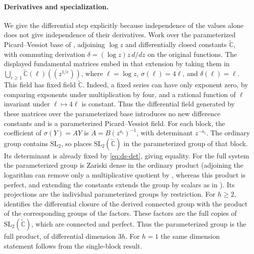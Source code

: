 \documentclass[11pt,a4paper]{article}
\theoremstyle{definition}
\theoremstyle{remark}
\numberwithin{equation}{section}
\begin{document}
\paragraph{Derivatives and specialization.}
We give the differential step explicitly because independence of the values alone does not give independence of their derivatives. Work over the parameterized Picard--Vessiot base of \cite{dsdhr}, adjoining \(\log z\) and differentially closed constants \(\widetilde{\mathbb C}\), with commuting derivation \(\delta=(\log z)z\,d/dz\) on the original functions. The displayed fundamental matrices embed in that extension by taking them in \(\bigcup_{e\geq1}\widetilde{\mathbb C}(\ell)((z^{1/e}))\), where \(\ell=\log z\), \(\sigma(\ell)=4\ell\), and \(\delta(\ell)=\ell\). This field has fixed field \(\widetilde{\mathbb C}\). Indeed, a fixed series can have only exponent zero, by comparing exponents under multiplication by four, and a rational function of \(\ell\) invariant under \(\ell\mapsto4\ell\) is constant. Thus the differential field generated by these matrices over the parameterized base introduces no new difference constants and is a parameterized Picard--Vessiot field. For each block, the coefficient of \(\sigma(Y)=A Y\) is \(A=B(z^{a_i})^{-1}\), with determinant \(z^{-a_i}\). The ordinary group contains \(\mathrm{SL}_2\), so \cite[Theorem 4.1]{dsdhr} places \(\mathrm{SL}_2(\widetilde{\mathbb C})\) in the parameterized group of that block. Its determinant is already fixed by \eqref{eq:ds-det}, giving equality. For the full system the parameterized group is Zariski dense in the ordinary product (adjoining the logarithm can remove only a multiplicative quotient by \cite[Proposition 1.6]{dsdhr}, whereas this product is perfect, and extending the constants extends the group by scalars as in \cite[Section 2]{dsdhr}). Its projections are the individual parameterized groups by restriction. For \(h\geq2\), \cite[Theorem 4.5]{dsdhr} identifies the differential closure of the derived connected group with the product of the corresponding groups of the factors. These factors are the full copies of \(\mathrm{SL}_2(\widetilde{\mathbb C})\), which are connected and perfect. Thus the parameterized group is the full product, of differential dimension \(3h\). For \(h=1\) the same dimension statement follows from the single-block result.
\end{document}
